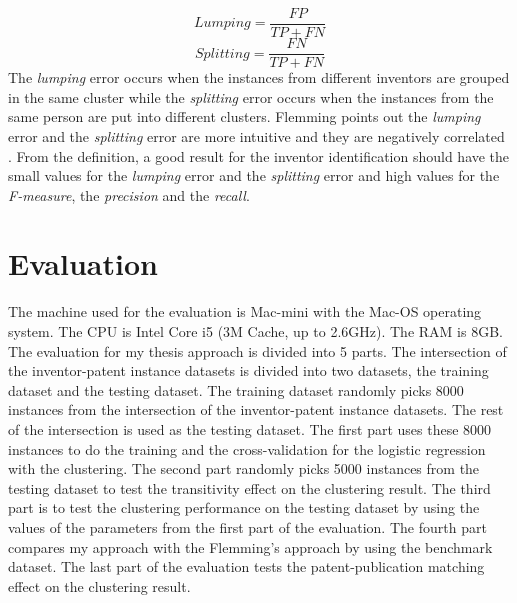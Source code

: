 \begin{equation}
Lumping=\frac{FP}{TP+FN}
\end{equation}
\begin{equation}
Splitting=\frac{FN}{TP+FN}
\end{equation}
The \emph{lumping} error occurs when the instances from different inventors are grouped in the same cluster while the \emph{splitting} error occurs when the instances from the same person are put into different clusters. Flemming points out the \emph{lumping} error and the \emph{splitting} error are more intuitive and they are negatively correlated \cite{RePEc:eee:respol:v:43:y:2014:i:6:p:941-955}. From the definition, a good result for the inventor identification should have the small values for the \emph{lumping} error and the \emph{splitting} error and high values for the \emph{F-measure}, the \emph{precision} and the \emph{recall}.

\section{Evaluation}
The machine used for the evaluation is Mac-mini with the Mac-OS operating system. The CPU is Intel Core i5 (3M Cache, up to 2.6GHz). The RAM is 8GB. The evaluation for my thesis approach is divided into 5 parts. The intersection of the inventor-patent instance datasets is divided into two datasets, the training dataset and the testing dataset. The training dataset randomly picks 8000 instances from the intersection of the inventor-patent instance datasets. The rest of the intersection is used as the testing dataset. The first part uses these 8000 instances to do the training and the cross-validation for the logistic regression with the clustering. The second part randomly picks 5000 instances from the testing dataset to test the transitivity effect on the clustering result. The third part is to test the clustering performance on the testing dataset by using the values of the parameters from the first part of the evaluation. The fourth part compares my approach with the Flemming's approach by using the benchmark dataset. The last part of the evaluation tests the patent-publication matching effect on the clustering result.

